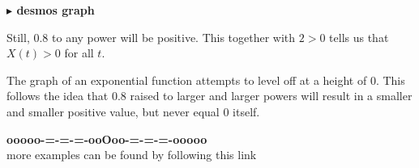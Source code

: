 \documentclass{ximera}
\begin{document}
\begin{example}
\begin{onlineOnly}
\textbf{\textcolor{blue!55!black}{$\blacktriangleright$ desmos graph}} 
\begin{center}
\end{center}
\end{onlineOnly}




Still, $0.8$ to any power will be positive.  This together with $2>0$ tells us that $X(t) > 0$ for all $t$.


\end{example}

The graph of an exponential function attempts to level off at a height of $0$.  This follows the idea that $0.8$ raised to larger and larger powers will result in a smaller and smaller positive value, but never equal $0$ itself.




































\begin{onlineOnly}
\begin{center}
\textbf{\textcolor{green!50!black}{ooooo-=-=-=-ooOoo-=-=-=-ooooo}} \\

more examples can be found by following this link\\ 

\end{center}
\end{onlineOnly}
\end{document}
